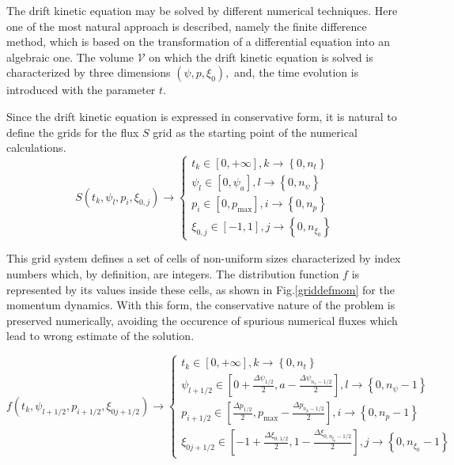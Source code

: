 
\label{Griddef}The drift kinetic equation may be solved by different
numerical techniques. Here one of the most natural approach is
described, namely the finite difference method, which is based on
the transformation of a differential equation into an algebraic one.
The volume $\mathcal{V}$ on which the drift kinetic equation is
solved is characterized by three dimensions $\left( \psi ,p,\xi
_{0}\right) ,$ and, the time evolution is introduced with the
parameter $t$.

Since the drift kinetic equation is expressed in conservative form, it is
natural to define the grids for the flux $S$ grid as the starting point of
the numerical calculations.
\begin{equation}
S\left( t_{k},\psi _{l},p_{i},\xi _{0,j}\right) \rightarrow \left\{
\begin{array}{l}
t_{k}\in \left[ 0,+\infty \right] ,k\rightarrow \left\{ 0,n_{t}\right\}  \\
\psi _{l}\in \left[ 0,\psi _{a}\right] ,l\rightarrow \left\{ 0,n_{\psi
}\right\}  \\
p_{i}\in \left[ 0,p_{\max }\right] ,i\rightarrow \left\{ 0,n_{p}\right\}  \\
\xi _{0,j}\in \left[ -1,1\right] ,j\rightarrow \left\{ 0,n_{\xi
_{0}}\right\}
\end{array}
\right.
\end{equation}

This grid system defines a set of cells of non-uniform sizes characterized
by index numbers which, by definition, are integers. The distribution
function $f$ is represented by its values inside these cells, as shown in
Fig.\ref{griddefmom} for the momentum dynamics. With this form, the
conservative nature of the problem is preserved numerically, avoiding the
occurence of spurious numerical fluxes which lead to wrong estimate of the
solution.

\begin{equation}
f\left( t_{k},\psi _{l+1/2},p_{i+1/2},\xi _{0j+1/2}\right) \rightarrow
\left\{
\begin{array}{l}
t_{k}\in \left[ 0,+\infty \right] ,k\rightarrow \left\{ 0,n_{t}\right\}  \\
\psi _{l+1/2}\in \left[ 0+\frac{\Delta \psi _{1/2}}{2},a-\frac{\Delta \psi
_{n_{r}-1/2}}{2}\right] ,l\rightarrow \left\{ 0,n_{\psi }-1\right\}  \\
p_{i+1/2}\in \left[ \frac{\Delta p_{1/2}}{2},p_{\max }-\frac{\Delta %
p_{n_{p}-1/2}}{2}\right] ,i\rightarrow \left\{ 0,n_{p}-1\right\}  \\
\xi _{0j+1/2}\in \left[ -1+\frac{\Delta \xi _{0,1/2}}{2},1-\frac{\Delta \xi
_{0,n_{\xi _{0}}-1/2}}{2}\right] ,j\rightarrow \left\{ 0,n_{\xi
_{0}}-1\right\}
\end{array}
\right.
\end{equation}

